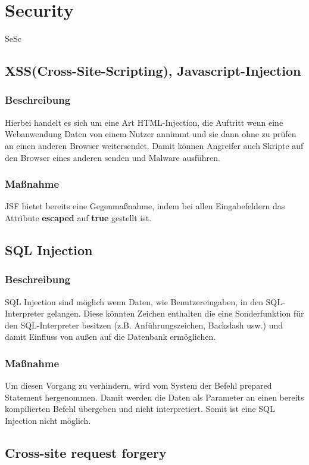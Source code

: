 \chapter{Security}
\begin{tiny}
	SeSc
\end{tiny}

\section{XSS(Cross-Site-Scripting), Javascript-Injection}
\subsection{Beschreibung}
Hierbei handelt es sich um eine Art HTML-Injection, die Auftritt wenn eine Webanwendung Daten von einem Nutzer annimmt und sie dann ohne zu prüfen an einen anderen Browser weitersendet. Damit können Angreifer auch Skripte auf den Browser eines anderen senden und Malware ausführen.
\subsection{Maßnahme}
JSF bietet bereits eine Gegenmaßnahme, indem bei allen Eingabefeldern das Attribute \textbf{escaped} auf \textbf{true} gestellt ist.

\section{SQL Injection}
\subsection{Beschreibung}
SQL Injection sind möglich wenn Daten, wie Benutzereingaben, in den SQL-Interpreter gelangen. Diese könnten Zeichen enthalten die eine Sonderfunktion für den SQL-Interpreter besitzen (z.B. Anführungszeichen, Backslash usw.) und damit Einfluss von außen auf die Datenbank ermöglichen. 
\subsection{Maßnahme}
Um diesen Vorgang zu verhindern, wird vom System der Befehl prepared Statement hergenommen. Damit werden die Daten als Parameter an einen bereits kompilierten Befehl übergeben und nicht interpretiert. Somit ist eine SQL Injection nicht möglich.


\section{Cross-site request forgery}
